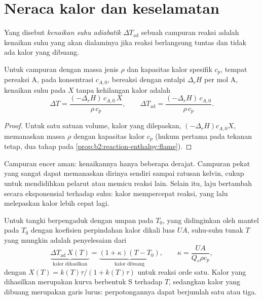 \section{Neraca kalor dan keselamatan}

\begin{definition}\label{def:b2:continuous-reactors:adiabatic-rise}
Yang disebut \emph{kenaikan suhu adiabatik}
$\Delta T_{\text{ad}}$ sebuah campuran reaksi adalah kenaikan suhu yang
akan dialaminya jika reaksi berlangsung tuntas dan tidak ada kalor yang
dibuang.
\end{definition}

\begin{proposition}\label{prop:b2:continuous-reactors:adiabatic}
Untuk campuran dengan massa jenis $\rho$ dan kapasitas kalor spesifik
$c_p$, tempat pereaksi A, pada konsentrasi $c_{A,0}$, bereaksi dengan
entalpi $\Delta_r H$ per mol A, kenaikan suhu pada  $X$ tanpa
kehilangan kalor adalah
\[
  \Delta T = \frac{(-\Delta_r H)\,c_{A,0}\,X}{\rho\,c_p}, \qquad
  \Delta T_{\text{ad}} = \frac{(-\Delta_r H)\,c_{A,0}}{\rho\,c_p} .
\]
\end{proposition}

\begin{proof}
Untuk satu satuan volume, kalor yang dilepaskan, $(-\Delta_r H)c_{A,0}X$,
memanaskan massa $\rho$ dengan kapasitas kalor $c_p$ (hukum pertama pada
tekanan tetap, dua tahap pada \cref{prop:b2:reaction-enthalpy:flame}).
\end{proof}

Campuran encer aman: kenaikannya hanya beberapa derajat. Campuran pekat
yang sangat  dapat memanaskan dirinya sendiri sampai ratusan
kelvin, cukup untuk mendidihkan pelarut atau memicu reaksi lain. Selain
itu, laju bertambah secara eksponensial terhadap suhu: kalor mempercepat
reaksi, yang lalu melepaskan kalor lebih cepat lagi.

\begin{proposition}\label{prop:b2:continuous-reactors:steady-states}
Untuk tangki berpengaduk dengan umpan pada $T_0$, yang didinginkan oleh
mantel pada $T_0$ dengan koefisien perpindahan kalor dikali luas $UA$,
suhu-suhu tunak $T$ yang mungkin adalah penyelesaian dari
\[
  \underbrace{\Delta T_{\text{ad}}\,X(T)}_{\text{kalor dihasilkan}} =
  \underbrace{(1 + \kappa)(T - T_0)}_{\text{kalor dibuang}}, \qquad
  \kappa = \frac{UA}{Q_v\rho c_p},
\]
dengan $X(T) = k(T)\tau/(1 + k(T)\tau)$ untuk reaksi orde satu. Kalor yang
dihasilkan merupakan kurva berbentuk S terhadap $T$, sedangkan kalor yang
dibuang merupakan garis lurus: perpotongannya dapat berjumlah satu atau
tiga.
\end{proposition}

